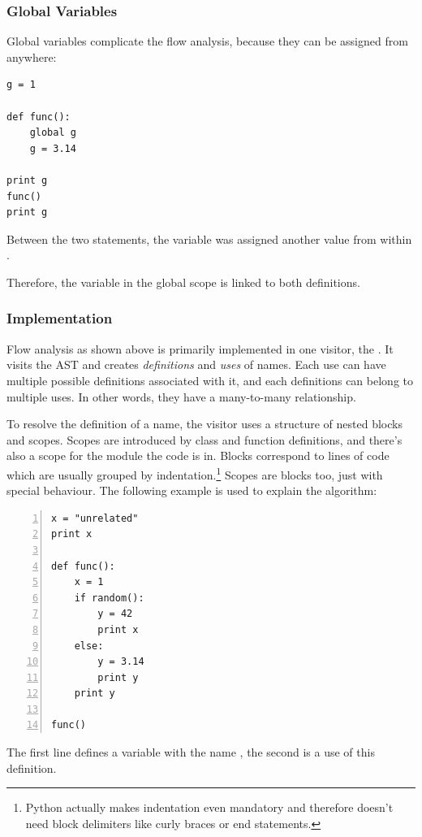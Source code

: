 \documentclass[12pt,halfparskip,DIV11,BCOR10mm]{scrreprt}
\begin{document}
\subsubsection{Global Variables}

Global variables complicate the flow analysis, because they can be assigned from anywhere:

\begin{lstlisting}
g = 1

def func():
    global g
    g = 3.14

print g
func()
print g
\end{lstlisting}

Between the two  statements, the variable  was assigned another value from within . 

Therefore, the variable  in the global scope is linked to both definitions.

\subsubsection{Implementation}

Flow analysis as shown above is primarily implemented in one visitor, the . It visits the AST and creates \emph{definitions} and \emph{uses} of names. Each use can have multiple possible definitions associated with it, and each definitions can belong to multiple uses. In other words, they have a many-to-many relationship.

To resolve the definition of a name, the visitor uses a structure of nested blocks and scopes. Scopes are introduced by class and function definitions, and there's also a scope for the module the code is in. Blocks correspond to lines of code which are usually grouped by indentation.\footnote{Python actually makes indentation even mandatory and therefore doesn't need block delimiters like curly braces or end statements.} Scopes are blocks too, just with special behaviour. The following example is used to explain the algorithm:

\begin{lstlisting}[numbers=left]
x = "unrelated"
print x

def func():
    x = 1
    if random():
        y = 42
        print x
    else:
        y = 3.14
        print y
    print y

func()
\end{lstlisting}

The first line defines a variable with the name , the second is a use of this definition.
\end{document}
